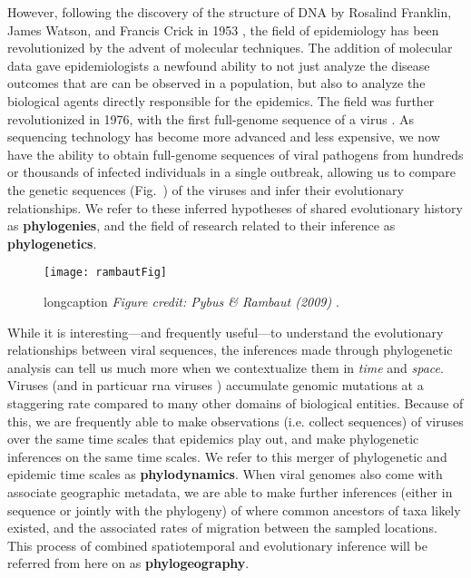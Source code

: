 However, following the discovery of the structure of DNA by Rosalind Franklin, James Watson, and Francis Crick in 1953 \citep{franklin1953molecular,watson1953molecular}, the field of epidemiology has been revolutionized by the advent of molecular techniques.
The addition of molecular data gave epidemiologists a newfound ability to not just analyze the disease outcomes that are can be observed in a population, but also to analyze the biological agents directly responsible for the epidemics.
The field was further revolutionized in 1976, with the first full-genome sequence of a virus \citep{fiers1976complete}.
As sequencing technology has become more advanced and less expensive, we now have the ability to obtain full-genome sequences of viral pathogens from hundreds or thousands of infected individuals in a single outbreak, allowing us to compare the genetic sequences (Fig.~) of the viruses and infer their evolutionary relationships.
We refer to these inferred hypotheses of shared evolutionary history as \textbf{phylogenies}, and the field of research related to their inference as \textbf{phylogenetics}.\\

\begin{figure}[ht]
  \centering
  \texttt{[image: rambautFig]}
  \caption[shortcaptionforindex]{longcaption \textit{Figure credit: Pybus \& Rambaut (2009)} \citep{pybus2009evolutionary}.}
  \label{fig:phylogeneticsOverview}
\end{figure}

While it is interesting---and frequently useful---to understand the evolutionary relationships between viral sequences, the inferences made through phylogenetic analysis can tell us much more when we contextualize them in \textit{time} and \textit{space}.
Viruses (and in particuar \gls{rna} viruses ) accumulate genomic mutations at a staggering rate compared to many other domains of biological entities.
Because of this, we are frequently able to make observations (i.e. collect sequences) of viruses over the same time scales that epidemics play out, and make phylogenetic inferences on the same time scales.
We refer to this merger of phylogenetic and epidemic time scales as \textbf{phylodynamics}.
When viral genomes also come with associate geographic metadata, we are able to make further inferences (either in sequence or jointly with the phylogeny) of where common ancestors of taxa likely existed, and the associated rates of migration between the sampled locations.
This process of combined spatiotemporal and evolutionary inference will be referred from here on as \textbf{phylogeography}.\\

